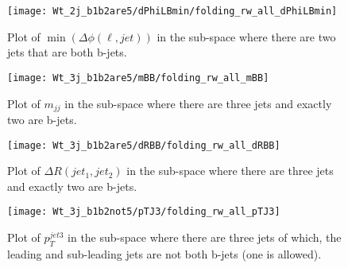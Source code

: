 \begin{figure}[h]
  \centering
  \texttt{[image: Wt\_2j\_b1b2are5/dPhiLBmin/folding\_rw\_all\_dPhiLBmin]}
  \caption{Plot of $\min(\Delta\phi(\ell, jet))$ in the sub-space where there
    are two jets that are both b-jets.}%
  \label{fig:mindphi-res}
\end{figure}

\begin{figure}[ht]
  \centering
  \texttt{[image: Wt\_3j\_b1b2are5/mBB/folding\_rw\_all\_mBB]}
  \caption{Plot of $m_{jj}$ in the sub-space where there are three
    jets and exactly two are b-jets.}%
  \label{fig:mbb-res}
\end{figure}

\begin{figure}[h]
  \centering
  \texttt{[image: Wt\_3j\_b1b2are5/dRBB/folding\_rw\_all\_dRBB]}
  \caption{Plot of $\Delta R(jet_1, jet_2)$ in the sub-space where there are
    three jets and exactly two are b-jets.}%
  \label{fig:dR-res}
\end{figure}

\begin{figure}[h]
  \centering
  \texttt{[image: Wt\_3j\_b1b2not5/pTJ3/folding\_rw\_all\_pTJ3]}
  \caption{Plot of $p^{jet3}_{T}$ in the sub-space where there are three
    jets of which, the leading and sub-leading jets are not both b-jets
    (one is allowed).}%
  \label{fig:pt3-res}
\end{figure}

